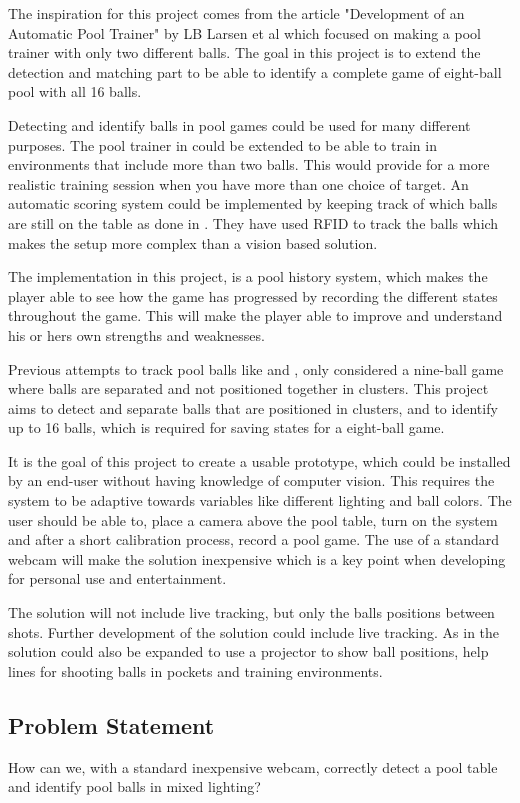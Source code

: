 The inspiration for this project comes from the article "Development of an Automatic Pool Trainer"\cite{larsbopool} by LB Larsen et al which focused on making a pool trainer with only two different balls. The goal in this project is to extend the detection and matching part to be able to identify a complete game of eight-ball pool with all 16 balls.

Detecting and identify balls in pool games could be used for many different purposes. The pool trainer in \cite{larsbopool} could be extended to be able to train in environments that include more than two balls. This would provide for a more realistic training session when you have more than one choice of target. An automatic scoring system could be implemented by keeping track of which balls are still on the table as done in \cite{autoscore}. They have used RFID to track the balls which makes the setup more complex than a vision based solution.

The implementation in this project, is a pool history system, which makes the player able to see how the game has progressed by recording the different states throughout the game. This will make the player able to improve and understand his or hers own strengths and weaknesses.

Previous attempts to track pool balls like \cite{supportBilliard} and \cite{ARPool}, only considered a nine-ball game where balls are separated and not positioned together in clusters. This project aims to detect and separate balls that are positioned in clusters, and to identify up to 16 balls, which is required for saving states for a eight-ball game.

It is the goal of this project to create a usable prototype, which could be installed by an end-user without having knowledge of computer vision. This requires the system to be adaptive towards variables like different lighting and ball colors. The user should be able to, place a camera above the pool table, turn on the system and after a short calibration process, record a pool game. The use of a standard webcam will make the solution inexpensive which is a key point when developing for personal use and entertainment.

The solution will not include live tracking, but only the balls positions between shots. Further development of the solution could include live tracking. As in \cite{larsbopool} the solution could also be expanded to use a projector to show ball positions, help lines for shooting balls in pockets and training environments. 

\subsection{Problem Statement}
How can we, with a standard inexpensive webcam, correctly detect a pool table and identify pool balls in mixed lighting?